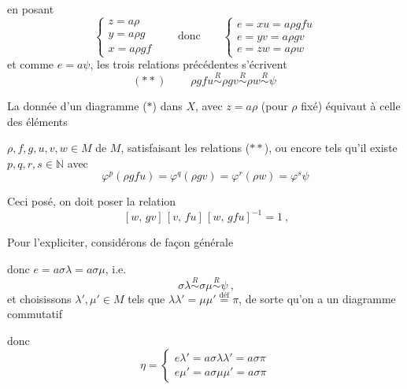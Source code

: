 \documentclass[11pt,a4paper]{article}
\begin{document}

en posant
\[
  \begin{cases}
    z = a\rho \\
    y = a\rho g \\
    x = a\rho g f
  \end{cases}
  \qquad\text{donc}\qquad
  \begin{cases}
    e = xu = a\rho g f u \\
    e = yv = a\rho g v \\
    e = zw = a\rho w
  \end{cases}
\]
et comme $e = a\psi$, les trois relations précédentes s'écrivent
\[
  (\ast\ast) \qquad
  \boxed{\ \rho g f u \overset{R}{\sim} \rho g v \overset{R}{\sim} \rho w \overset{R}{\sim} \psi\ }
\]

La donnée d'un diagramme ($\ast$) dans $X$, avec $z = a\rho$ (pour $\rho$ fixé)
équivaut à celle des  éléments


$\rho, f, g, u, v, w \in M$ de $M$, satisfaisant les relations ($\ast\ast$), ou
encore tels qu'il existe $p,q,r,s \in \mathbb{N}$ avec
\[
  \boxed{\ \varphi^{p}(\rho g f u) = \varphi^{q}(\rho g v) = \varphi^{r}(\rho w) = \varphi^{s}\psi\ }
\]

Ceci posé, on doit poser la relation
\[
  \boxed{\ [w,\, gv]\,[v,\, fu]\,[w,\, gfu]^{-1} = 1\ } ,
\]

Pour l'expliciter, considérons de façon générale


donc $e = a\sigma\lambda = a\sigma\mu$, i.e.
\[
  \boxed{\ \sigma\lambda \overset{R}{\sim} \sigma\mu \overset{R}{\sim} \psi\ } ,
\]
et choisissons $\lambda', \mu' \in M$ tels que
$\lambda\lambda' = \mu\mu' \overset{\text{déf}}{=} \pi$, de sorte qu'on a un
diagramme commutatif


donc
\[
  \eta =
  \begin{cases}
    e\lambda' = a\sigma\lambda\lambda' = a\sigma\pi \\
    e\mu' = a\sigma\mu\mu' = a\sigma\pi
  \end{cases}
\]
\end{document}
